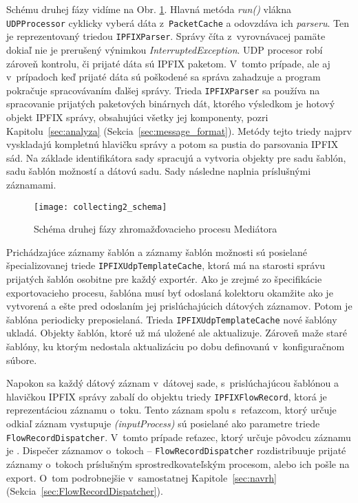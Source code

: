 Schému druhej fázy vidíme na Obr. \ref{o:collecting2_schema}. Hlavná metóda \emph{run()} vlákna 
\verb|UDPProcessor| cyklicky vyberá dáta z~\verb|PacketCache| a odovzdáva ich \emph{parseru}. 
Ten je reprezentovaný 
triedou \verb|IPFIXParser|. Správy číta z~vyrovnávacej pamäte dokiaľ nie je prerušený výnimkou 
\emph{InterruptedException}.
UDP procesor robí zároveň kontrolu, či prijaté dáta sú IPFIX paketom. V~tomto prípade, ale aj v~prípadoch
keď prijaté dáta sú poškodené sa správa zahadzuje a program pokračuje spracovávaním ďalšej správy.
Trieda \verb|IPFIXParser| sa používa na spracovanie prijatých paketových binárnych dát, ktorého 
výsledkom je hotový objekt IPFIX správy, obsahujúci všetky jej komponenty, pozri 
Kapitolu~\ref{sec:analyza} (Sekcia~\ref{sec:message_format}). Metódy tejto triedy najprv vyskladajú 
kompletnú hlavičku správy a potom sa pustia do parsovania IPFIX sád. Na základe identifikátora sady 
spracujú a vytvoria objekty pre sadu šablón, sadu šablón možností a dátovú sadu. Sady následne naplnia 
príslušnými záznamami. 

\begin{figure}[ht!]
\centering
\texttt{[image: collecting2\_schema]}
\caption{Schéma druhej fázy zhromažďovacieho procesu Mediátora}\label{o:collecting2_schema}
\end{figure}

Prichádzajúce záznamy šablón a záznamy šablón možnosti sú posielané špecializovanej triede 
\verb|IPFIXUdpTemplateCache|, ktorá má na starosti správu prijatých šablón osobitne pre každý exportér. 
Ako je zrejmé zo špecifikácie exportovacieho procesu, šablóna musí byť odoslaná kolektoru okamžite ako je 
vytvorená a ešte pred odoslaním jej prislúchajúcich dátových záznamov. Potom je šablóna periodicky 
preposielaná. Trieda \verb|IPFIXUdpTemplateCache| nové šablóny ukladá. Objekty šablón, ktoré už má 
uložené ale aktualizuje. Zároveň maže staré šablóny, ku ktorým nedostala aktualizáciu po dobu definovanú
v~konfiguračnom súbore.

Napokon sa každý dátový záznam v~dátovej sade, s~prislúchajúcou šablónou a hlavičkou IPFIX správy 
zabalí do objektu triedy \verb|IPFIXFlowRecord|, ktorá je reprezentáciou záznamu o~toku. 
Tento záznam spolu s~reťazcom, ktorý určuje odkiaľ záznam vystupuje \emph{(inputProcess)} sú posielané
ako parametre triede \verb|FlowRecordDispatcher|. V~tomto prípade reťazec, ktorý určuje pôvodcu záznamu 
je \emph{}. 
Dispečer záznamov o~tokoch -- \verb|FlowRecordDispatcher| rozdistribuuje prijaté záznamy o~tokoch 
príslušným sprostredkovateľským procesom, alebo ich pošle na export. O~tom podrobnejšie v~samostatnej 
Kapitole~\ref{sec:navrh} (Sekcia~\ref{sec:FlowRecordDispatcher}). 

